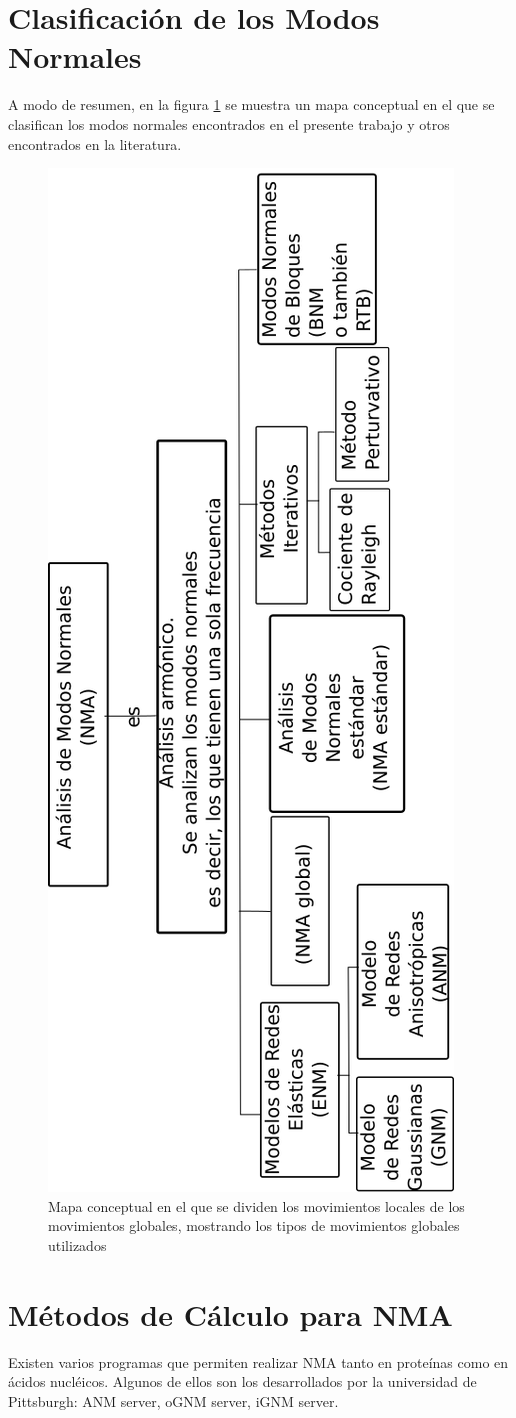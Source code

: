 \section{Clasificaci\'{o}n de los Modos Normales}
A modo de resumen, en la figura \ref{fig:movs} se muestra un mapa conceptual en el que se clasifican los modos normales encontrados en el presente trabajo y otros encontrados en la literatura.\\
\begin{figure}[h]
\centering%
%
\includegraphics[scale=0.5, angle=-90]{Kap2/mapa.png}%
\caption{Mapa conceptual en el que se dividen los movimientos locales de los movimientos globales, mostrando los tipos de movimientos globales utilizados} \label{fig:movs}
\end{figure}
\section{M\'{e}todos de C\'{a}lculo para NMA}

Existen varios programas que permiten realizar NMA tanto en prote\'{i}nas como en \'{a}cidos nucl\'{e}icos. Algunos de ellos son los desarrollados por la universidad de Pittsburgh: ANM server, oGNM server, iGNM server.